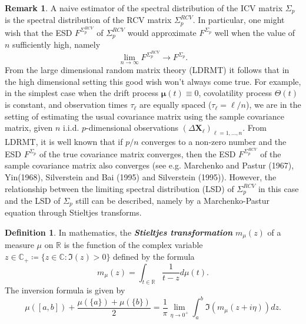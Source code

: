 \documentclass[a4paper,11pt]{book}
\theoremstyle{plain}
\theoremstyle{definition}
\newtheorem{defn}[thm]{Definition}
\newtheorem{rmrk}[thm]{Remark}
\newcommand{\MR}{\mathbb{R}}
\newcommand{\define}[1]{\textit{\textbf{#1}}}
\begin{document}
	\begin{rmrk}
		A naive estimator of the spectral distribution of the ICV matrix $\Sigma_p$ is the spectral distribution of the RCV matrix $\Sigma_p^{RCV}$. In particular, one might wish that the ESD $F^{\Sigma_p^{RCV}}$ of $\Sigma_p^{RCV}$ would approximate $F^{\Sigma_p}$ well when the value of $n$ sufficiently high, namely
		\[ \lim_{n \rightarrow \infty} F^{\Sigma_p^{RCV}} \rightarrow F^{\Sigma_p}. \]
		From the large dimensional random matrix theory (LDRMT) it follows that in the high dimensional setting this good wish won't always come true. For example, in the simplest case when the drift process $\boldsymbol{\mu}(t) \equiv 0$, covolatility process $\Theta(t)$ is constant, and observation times $\tau_\ell$ are equally spaced ($\tau_\ell = \ell / n$), we are in the setting of estimating the usual covariance matrix using the sample covariance matrix, given $n$ i.i.d. $p$-dimensional observations $(\Delta \mathbf{X}_\ell)_{\ell=1, \dots, n}$. From LDRMT, it is well known that if $p/n$ converges to a non-zero number and the ESD $F^{\Sigma_p}$ of the true covariance matrix converges, then the ESD $F^{\Sigma_p^{RCV}}$ of the sample covariance matrix also converges (see e.g. Marchenko and Pastur (1967), Yin(1968), Silverstein and Bai (1995) and Silverstein (1995)). However, the relationship between the limiting spectral distribution (LSD) of $\Sigma_p^{RCV}$ in this case and the LSD of $\Sigma_p$ still can be described, namely by a Marchenko-Pastur equation through Stieltjes transforms.
	\end{rmrk}
	
	\begin{defn}
		In mathematics, the \define{Stieltjes transformation} $m_\mu(z)$ of a measure $\mu$ on $\MR$ is the function of the complex variable $z \in \mathbb{C}_+ \coloneqq \{ z \in \mathbb{C} : \Im(z)>0 \}$ defined by the formula
		\[  
		m_\mu(z) = \int_{t \in \MR} \frac{1}{t - z} d\mu(t).
		\]
		The inversion formula is given by
		\begin{equation} \label{inverse Stieltjes transform}
		\mu([a, b]) + \frac{\mu(\{a\}) + \mu(\{b\})}{2}  = \frac{1}{\pi} \lim_{\eta \rightarrow 0^+} \int_{a}^{b} \Im (m_\mu(z+i\eta)) dz.
		\end{equation}
	\end{defn}
	
\end{document}
